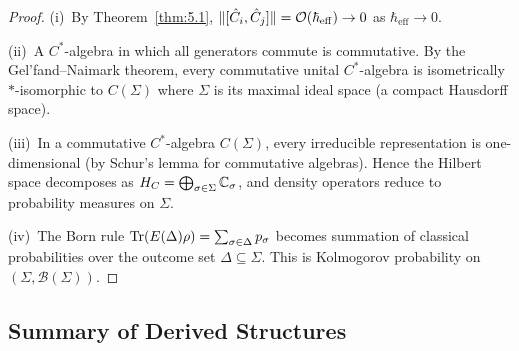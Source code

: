 \begin{proof}
(i)~By Theorem~\ref{thm:5.1},
$\|[\hat{C}_i, \hat{C}_j]\| = \mathcal{O}(\hbar_{\mathrm{eff}}) \to 0$
as $\hbar_{\mathrm{eff}} \to 0$.

(ii)~A $C^*$-algebra in which all generators commute is commutative.
By the Gel'fand--Naimark theorem, every commutative unital $C^*$-algebra
is isometrically $*$-isomorphic to $C(\Sigma)$ where $\Sigma$ is its
maximal ideal space (a compact Hausdorff space).

(iii)~In a commutative $C^*$-algebra $C(\Sigma)$, every irreducible
representation is one-dimensional (by Schur's lemma for commutative
algebras).  Hence the Hilbert space decomposes as
$H_C = \bigoplus_{\sigma \in \Sigma} \mathbb{C}_\sigma$, and density
operators reduce to probability measures on $\Sigma$.

(iv)~The Born rule $\mathrm{Tr}(E(\Delta)\rho) = \sum_{\sigma \in \Delta}
p_\sigma$ becomes summation of classical probabilities over the outcome
set $\Delta \subseteq \Sigma$.  This is Kolmogorov probability on
$(\Sigma, \mathscr{B}(\Sigma))$.
\end{proof}

\subsection{Summary of Derived Structures}
\label{sec:ch5:summary}

